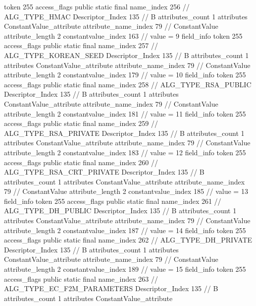 {{{{{				token	255
				access_flags	public static final
				name_index	256		// ALG_TYPE_HMAC
				Descriptor_Index	135		// B
				attributes_count	1
				attributes {
				ConstantValue_attribute {
					attribute_name_index	79		// ConstantValue
					attribute_length	2
					constantvalue_index	163		// value = 9
				}
				}
			}
			field_info {
				token	255
				access_flags	public static final
				name_index	257		// ALG_TYPE_KOREAN_SEED
				Descriptor_Index	135		// B
				attributes_count	1
				attributes {
				ConstantValue_attribute {
					attribute_name_index	79		// ConstantValue
					attribute_length	2
					constantvalue_index	179		// value = 10
				}
				}
			}
			field_info {
				token	255
				access_flags	public static final
				name_index	258		// ALG_TYPE_RSA_PUBLIC
				Descriptor_Index	135		// B
				attributes_count	1
				attributes {
				ConstantValue_attribute {
					attribute_name_index	79		// ConstantValue
					attribute_length	2
					constantvalue_index	181		// value = 11
				}
				}
			}
			field_info {
				token	255
				access_flags	public static final
				name_index	259		// ALG_TYPE_RSA_PRIVATE
				Descriptor_Index	135		// B
				attributes_count	1
				attributes {
				ConstantValue_attribute {
					attribute_name_index	79		// ConstantValue
					attribute_length	2
					constantvalue_index	183		// value = 12
				}
				}
			}
			field_info {
				token	255
				access_flags	public static final
				name_index	260		// ALG_TYPE_RSA_CRT_PRIVATE
				Descriptor_Index	135		// B
				attributes_count	1
				attributes {
				ConstantValue_attribute {
					attribute_name_index	79		// ConstantValue
					attribute_length	2
					constantvalue_index	185		// value = 13
				}
				}
			}
			field_info {
				token	255
				access_flags	public static final
				name_index	261		// ALG_TYPE_DH_PUBLIC
				Descriptor_Index	135		// B
				attributes_count	1
				attributes {
				ConstantValue_attribute {
					attribute_name_index	79		// ConstantValue
					attribute_length	2
					constantvalue_index	187		// value = 14
				}
				}
			}
			field_info {
				token	255
				access_flags	public static final
				name_index	262		// ALG_TYPE_DH_PRIVATE
				Descriptor_Index	135		// B
				attributes_count	1
				attributes {
				ConstantValue_attribute {
					attribute_name_index	79		// ConstantValue
					attribute_length	2
					constantvalue_index	189		// value = 15
				}
				}
			}
			field_info {
				token	255
				access_flags	public static final
				name_index	263		// ALG_TYPE_EC_F2M_PARAMETERS
				Descriptor_Index	135		// B
				attributes_count	1
				attributes {
				ConstantValue_attribute {
}}}}}}}
